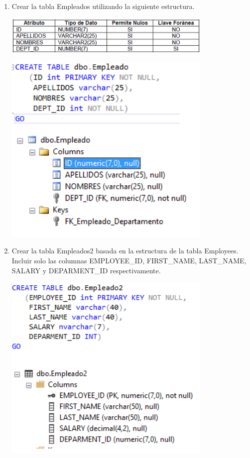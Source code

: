 \begin{enumerate}[1.]
	\item Crear la tabla Empleados utilizando la siguiente estructura.
	\\
	\begin{center}
	\includegraphics[width=10cm]{./Imagenes/enun3} 
	\end{center}
	\begin{center}
	\includegraphics[width=10cm]{./Imagenes/eje3} 
	\end{center}
	
	\item Crear la tabla Empleados2 basada en la estructura de la tabla Employees. Incluir solo las columnas EMPLOYEE\_ID, FIRST\_NAME, LAST\_NAME, SALARY y DEPARMENT\_ID 		respectivamente.
	\\
	\begin{center}
	\includegraphics[width=10cm]{./Imagenes/eje4} 
	\end{center}
	

\end{enumerate}
